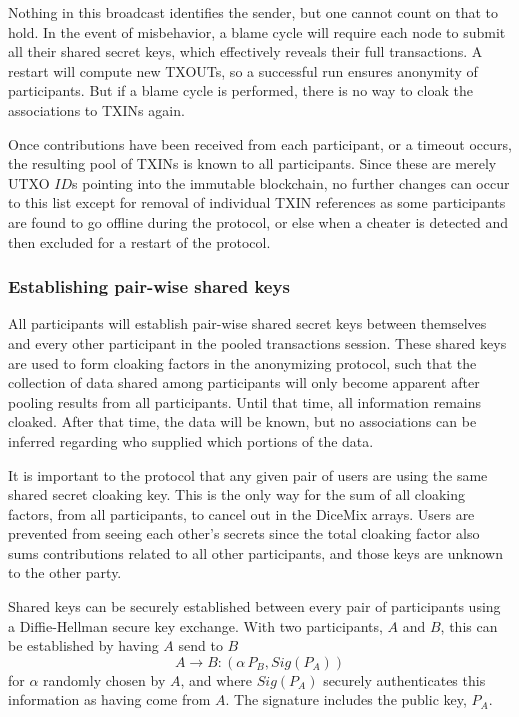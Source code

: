 \documentclass[a4paper, 10pt, conference]{ieeeconf}
\begin{document}
Nothing in this broadcast identifies the sender, but one cannot count on that to hold. In the event of misbehavior, a blame cycle will require each node to submit all their shared secret keys, which effectively reveals their full transactions. A restart will compute new TXOUTs, so a successful run ensures anonymity of participants. But if a blame cycle is performed, there is no way to cloak the associations to TXINs again.

Once contributions have been received from each participant, or a timeout occurs, the resulting pool of TXINs is known to all participants. Since these are merely UTXO $ID$s pointing into the immutable blockchain, no further changes can occur to this list except for removal of individual TXIN references as some participants are found to go offline during the protocol, or else when a cheater is detected and then excluded for a restart of the protocol.

\subsubsection{Establishing pair-wise shared keys} All participants will establish pair-wise shared secret keys between themselves and every other participant in the pooled transactions session. These shared keys are used to form cloaking factors in the anonymizing protocol, such that the collection of data shared among participants will only become apparent after pooling results from all participants. Until that time, all information remains cloaked. After that time, the data will be known, but no associations can be inferred regarding who supplied which portions of the data. 

It is important to the protocol that any given pair of users are using the same shared secret cloaking key. This is the only way for the sum of all cloaking factors, from all participants, to cancel out in the DiceMix arrays. Users are prevented from seeing each other's secrets since the total cloaking factor also sums contributions related to all other participants, and those keys are unknown to the other party.

Shared keys can be securely established between every pair of participants using a Diffie-Hellman secure key exchange\cite{c21}. With two participants, $A$ and $B$, this can be established by having $A$ send to $B$
$$A \rightarrow B: (\alpha \, P_B, Sig(P_A))$$
for $\alpha$ randomly chosen by $A$, and where $Sig(P_A)$ securely authenticates this information as having come from $A$. The signature includes the public key, $P_A$. 
\end{document}
